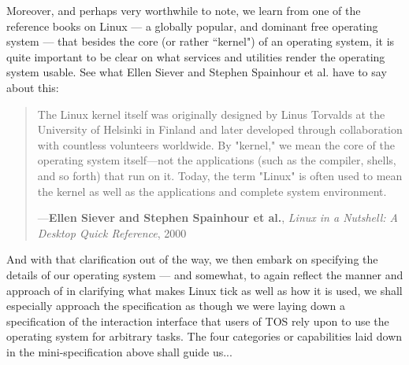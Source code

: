 \documentclass[a4paper, 18pt]{book} %
\begin{document}
{{{Moreover, and perhaps very worthwhile to note, we learn from one of the reference books on Linux --- a globally popular, and dominant free operating system --- that besides the core (or rather ``kernel") of an operating system, it is quite important to be clear on what services and utilities render the operating system usable. See what Ellen Siever and Stephen Spainhour et al. have to say about this:


\noindent
\begin{minipage}{1\textwidth}
\vspace{2em}
\begin{quotation}
{\ttfamily 

The Linux kernel itself was originally designed by Linus Torvalds at the University of Helsinki in Finland and later developed through collaboration with countless volunteers worldwide. By "kernel," we mean the core of the operating system itself---not the applications (such as the compiler, shells, and so forth) that run on it. Today, the term "Linux" is often used to mean the kernel as well as the applications and complete system environment.

}
\hspace*{\fill} ---\textbf{Ellen Siever and Stephen Spainhour et al.}, \textit{Linux in a Nutshell: A Desktop Quick Reference}, 2000\cite{Siever2000LinuxNutshell}
\end{quotation}
\vspace{2em}
\end{minipage}



And with that clarification out of the way, we then embark on specifying the details of our operating system --- and somewhat, to again reflect the manner and approach of \cite{Siever2000LinuxNutshell} in clarifying what makes Linux tick as well as how it is used, we shall especially approach the specification as though we were laying down a specification of the interaction interface that users of TOS rely upon to use the operating system for arbitrary tasks. The four categories or capabilities laid down in the mini-specification above shall guide us...


\vspace{2em}


}}}
\end{document}
